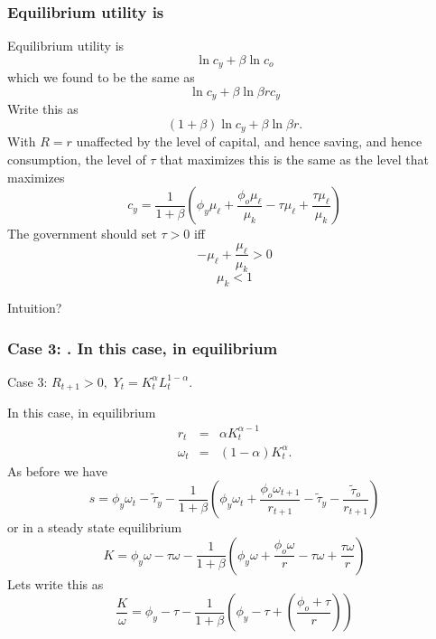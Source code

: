 \documentclass[aspectratio=169]{ltx-talk}
\begin{document}
\begin{frame}
\frametitle{Equilibrium utility is}
Equilibrium utility is%
\begin{equation*}
\ln c_{y}+\beta \ln c_{o}
\end{equation*}%
which we found to be the same as%
\begin{equation*}
\ln c_{y}+\beta \ln \beta rc_{y}
\end{equation*}%
Write this as 
\begin{equation*}
\left( 1+\beta \right) \ln c_{y}+\beta \ln \beta r.
\end{equation*}%
With $R=r$ unaffected by the level of capital, and hence saving, and hence
consumption, the level of $\tau $ that maximizes this is the same as the
level that maximizes 
\begin{equation*}
c_{y}=\frac{1}{1+\beta }\left( \phi _{y}\mu _{\ell }+\frac{\phi _{o}\mu
_{\ell }}{\mu _{k}}-\tau \mu _{\ell }+\frac{\tau \mu _{\ell }}{\mu _{k}}%
\right)
\end{equation*}%
The government should set $\tau >0$ iff%
\begin{equation*}
-\mu _{\ell }+\frac{\mu _{\ell }}{\mu _{k}}>0
\end{equation*}%
\begin{equation*}
\mu _{k}<1
\end{equation*}

Intuition?
\end{frame}

\begin{frame}
\frametitle{Case 3: . In this case, in equilibrium}
Case 3: $R_{t+1}>0,$ $Y_{t}=K_{t}^{\alpha }L_{t}^{1-\alpha }$.

In this case, in equilibrium%
\begin{eqnarray*}
r_{t} &=&\alpha K_{t}^{\alpha -1} \\
\omega _{t} &=&\left( 1-\alpha \right) K_{t}^{\alpha }.
\end{eqnarray*}%
As before we have 
\begin{equation*}
s=\phi _{y}\omega _{t}-\tilde{\tau}_{y}-\frac{1}{1+\beta }\left( \phi
_{y}\omega _{t}+\frac{\phi _{o}\omega _{t+1}}{r_{t+1}}-\tilde{\tau}_{y}-%
\frac{\tilde{\tau}_{o}}{r_{t+1}}\right)
\end{equation*}%
or in a steady state equilibrium 
\begin{equation*}
K=\phi _{y}\omega -\tau \omega -\frac{1}{1+\beta }\left( \phi _{y}\omega +%
\frac{\phi _{o}\omega }{r}-\tau \omega +\frac{\tau \omega }{r}\right)
\end{equation*}%
Lets write this as 
\begin{equation*}
\frac{K}{\omega }=\phi _{y}-\tau -\frac{1}{1+\beta }\left( \phi _{y}-\tau
+\left( \frac{\phi _{o}+\tau }{r}\right) \right)
\end{equation*}%
\end{frame}
\end{document}
